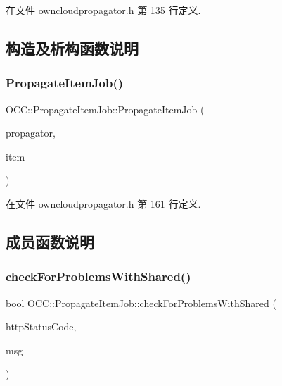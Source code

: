 在文件 owncloudpropagator.\+h 第 135 行定义.



\subsection{构造及析构函数说明}
\mbox{\label{class_o_c_c_1_1_propagate_item_job_a256ca79c551c1a3cb2a2d3a5308d6a88}} 
\subsubsection{\texorpdfstring{Propagate\+Item\+Job()}{PropagateItemJob()}}
{\footnotesize\ttfamily O\+C\+C\+::\+Propagate\+Item\+Job\+::\+Propagate\+Item\+Job (\begin{DoxyParamCaption}\item[{\hyperlink{class_o_c_c_1_1_owncloud_propagator}{Owncloud\+Propagator} $\ast$}]{propagator,  }\item[{const \hyperlink{namespace_o_c_c_acb6b0db82893659fbd0c98d3c5b8e2b8}{Sync\+File\+Item\+Ptr} \&}]{item }\end{DoxyParamCaption})}



在文件 owncloudpropagator.\+h 第 161 行定义.



\subsection{成员函数说明}
\mbox{\label{class_o_c_c_1_1_propagate_item_job_a1be9643bf431843358a19ec23239a04b}} 
\subsubsection{\texorpdfstring{check\+For\+Problems\+With\+Shared()}{checkForProblemsWithShared()}}
{\footnotesize\ttfamily bool O\+C\+C\+::\+Propagate\+Item\+Job\+::check\+For\+Problems\+With\+Shared (\begin{DoxyParamCaption}\item[{int}]{http\+Status\+Code,  }\item[{const Q\+String \&}]{msg }\end{DoxyParamCaption})\hspace{0.3cm}{\ttfamily [protected]}}

